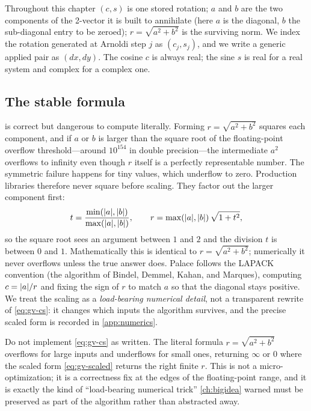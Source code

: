 \begin{notationbox}
Throughout this chapter $(c,s)$ is one stored rotation; $a$ and $b$ are the two
components of the 2-vector it is built to annihilate (here $a$ is the diagonal, $b$ the
sub-diagonal entry to be zeroed); $r = \sqrt{a^2+b^2}$ is the surviving norm. We index
the rotation generated at Arnoldi step $j$ as $(c_j, s_j)$, and we write a generic
applied pair as $(dx, dy)$. The cosine $c$ is always real; the sine $s$ is real for a
real system and complex for a complex one.
\end{notationbox}

\subsection{The stable formula}
\label{sec:gv-stable}

 is correct but dangerous to compute literally. Forming $r =
\sqrt{a^2 + b^2}$ squares each component, and if $a$ or $b$ is larger than the square
root of the floating-point overflow threshold---around $10^{154}$ in double
precision---the intermediate $a^2$ overflows to infinity even though $r$ itself is a
perfectly representable number. The symmetric failure happens for tiny values, which
underflow to zero. Production libraries therefore never square before scaling. They
factor out the larger component first:
\begin{equation}
\label{eq:gv-scaled}
  t = \frac{\min(\lvert a\rvert,\lvert b\rvert)}{\max(\lvert a\rvert,\lvert b\rvert)}, \qquad
  r = \max(\lvert a\rvert,\lvert b\rvert)\,\sqrt{1 + t^2},
\end{equation}
so the square root sees an argument between $1$ and $2$ and the division $t$ is between
$0$ and $1$. Mathematically this is identical to $r = \sqrt{a^2+b^2}$; numerically it
never overflows unless the true answer does. Palace follows the LAPACK convention
(the algorithm of Bindel, Demmel, Kahan, and Marques), computing $c = \lvert a\rvert / r$ and
fixing the sign of $r$ to match $a$ so that the diagonal stays positive. We treat the
scaling as a \emph{load-bearing numerical detail}, not a transparent rewrite of
\cref{eq:gv-cs}: it changes which inputs the algorithm survives, and the precise scaled
form is recorded in \cref{app:numerics}.

\begin{pitfall}
Do not implement \cref{eq:gv-cs} as written. The literal formula
$r=\sqrt{a^2+b^2}$ overflows for large inputs and underflows for small ones, returning
$\infty$ or $0$ where the scaled form \eqref{eq:gv-scaled} returns the right finite
$r$. This is not a micro-optimization; it is a correctness fix at the edges of the
floating-point range, and it is exactly the kind of ``load-bearing numerical trick''
\cref{ch:bigidea} warned must be preserved as part of the algorithm rather than
abstracted away.
\end{pitfall}

